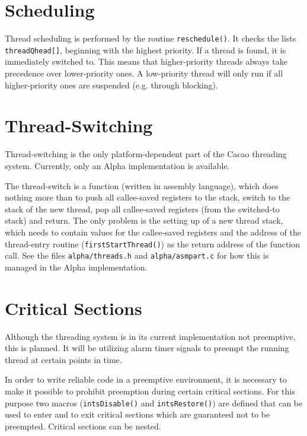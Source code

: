 \documentclass[twocolumn,a4paper]{article}      %
\begin{document}
\section{Scheduling}
\label{sec:scheduling}

Thread scheduling is performed by the routine
\texttt{reschedule()}. It checks the lists
\texttt{threadQhead[]}, beginning with the highest priority. If a thread is found, it is
immediately switched to. This means that higher-priority threads
always take precedence over lower-priority ones. A low-priority thread
will only run if all higher-priority ones are suspended (e.g. through
blocking).

\section{Thread-Switching}
\label{sec:threadswitching}

Thread-switching is the only platform-dependent part of the Cacao
threading system. Currently, only an Alpha implementation is
available.

The thread-switch is a function (written in assembly language), which
does nothing more than to push all callee-saved registers to the
stack, switch to the stack of the new thread, pop all callee-saved
registers (from the switched-to stack) and return. The only problem is
the setting up of a new thread stack, which needs to contain values
for the callee-saved registers and the address of the thread-entry
routine (\texttt{firstStartThread()}) as the return address of the
function call.  See the files \texttt{alpha/threads.h} and
\texttt{alpha/asmpart.c} for how this is managed in the Alpha
implementation.

\section{Critical Sections}
\label{sec:criticalsections}

Although the threading system is in its current implementation not
preemptive, this is planned.  It will be utilizing alarm timer signals
to preempt the running thread at certain points in time.

In order to write reliable code in a preemptive environment, it is
necessary to make it possible to prohibit preemption during certain
critical sections. For this purpose two macros (\texttt{intsDisable()}
and \texttt{intsRestore()}) are defined that can be used to enter and
to exit critical sections which are guaranteed not to be
preempted. Critical sections can be nested.
\end{document}
